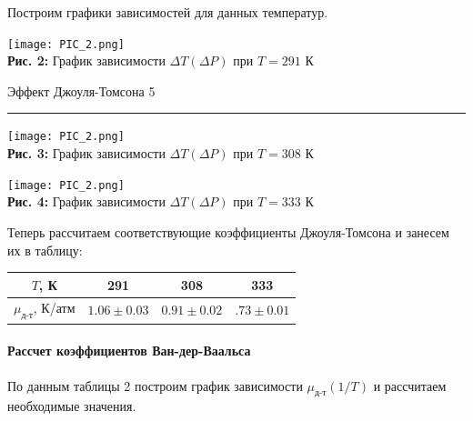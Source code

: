 \documentclass[12pt,a4paper]{scrartcl}
\begin{document}
	Построим графики зависимостей для данных температур.
	
	\begin{center}
		\texttt{[image: PIC\_2.png]}
		\\\textbf{Рис. 2:} График зависимости $\Delta T (\Delta P)$ при $T = 291$ К
	\end{center}

	\newpage 
	
	
	\begin{flushleft}
		\footnotesize{Эффект Джоуля-Томсона} \hspace{\fill} \footnotesize{5}
		\\[-0.3cm]\noindent\rule{\textwidth}{0.3pt}
	\end{flushleft}

	\begin{center}
		\texttt{[image: PIC\_2.png]}
		\\\textbf{Рис. 3:} График зависимости $\Delta T (\Delta P)$ при $T = 308$ К
	\end{center}

	\begin{center}
		\texttt{[image: PIC\_2.png]}
		\\\textbf{Рис. 4:} График зависимости $\Delta T (\Delta P)$ при $T = 333$ К
	\end{center}

	Теперь рассчитаем соответствующие коэффициенты Джоуля-Томсона и занесем их в таблицу:
	
	\begin{center}
		\begin{tabular}{|c|c|c|c|}
			\hline
			$T$, К & 291 & 308 & 333
			\\\hline
			$\mu_{\text{д-т}}$, К/атм & $1.06 \pm 0.03$ & $0.91 \pm 0.02$ & $.73 \pm 0.01$
			\\\hline
		\end{tabular}
	\end{center}

	\paragraph{Рассчет коэффициентов Ван-дер-Ваальса} \hfill

	По данным таблицы 2 построим график зависимости $\mu_{\text{д-т}}(1/T)$ и рассчитаем необходимые значения.
	
	\newpage 
	
	
\end{document}
